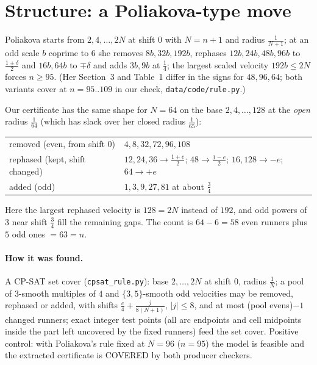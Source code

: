 \documentclass[10pt]{article}
\begin{document}
\section{Structure: a Poliakova-type move}\label{sec:structure}
Poliakova \cite{pol} starts from $2,4,\dots,2N$ at shift $0$ with $N=n+1$ and radius $\frac1{N+1}$; at an odd scale $b$ coprime to $6$ she removes $8b,32b,192b$, rephases $12b,24b,48b,96b$ to $\frac{1\pm\delta}2$ and $16b,64b$ to $\mp\delta$ and adds $3b,9b$ at $\frac14$; the largest scaled velocity $192b\le2N$ forces $n\ge95$. (Her Section~3 and Table~1 differ in the signs for $48,96,64$; both variants cover at $n=95..109$ in our check, \texttt{data/code/rule.py}.)

Our certificate has the same shape for $N=64$ on the base $2,4,\dots,128$ at the \emph{open} radius $\frac1{64}$ (which has slack over her closed radius $\frac1{65}$):
\begin{center}\small\begin{tabular}{ll}\toprule
removed (even, from shift $0$) & $4,8,32,72,96,108$\\
rephased (kept, shift changed) & $12,24,36\to\frac{1+e}2$; $48\to\frac{1-e}2$; $16,128\to-e$; $64\to+e$\\
added (odd) & $1,3,9,27,81$ at about $\frac34$\\\bottomrule
\end{tabular}\end{center}
Here the largest rephased velocity is $128=2N$ instead of $192$, and odd powers of $3$ near shift $\frac34$ fill the remaining gaps. The count is $64-6=58$ even runners plus $5$ odd ones $=63=n$.
\paragraph{How it was found.} A CP-SAT set cover (\texttt{cpsat\_rule.py}): base $2,\dots,2N$ at shift $0$, radius $\frac1N$; a pool of $3$-smooth multiples of $4$ and $\{3,5\}$-smooth odd velocities may be removed, rephased or added, with shifts $\frac c4+\frac j{8(N+1)}$, $|j|\le8$, and at most (pool evens)$-1$ changed runners; exact integer test points (all arc endpoints and cell midpoints inside the part left uncovered by the fixed runners) feed the set cover. Positive control: with Poliakova's rule fixed at $N=96$ ($n=95$) the model is feasible and the extracted certificate is COVERED by both producer checkers.
\end{document}
